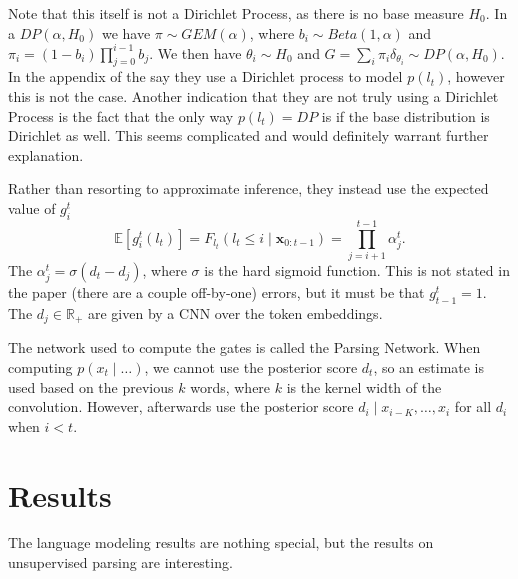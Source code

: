 \documentclass{article}
\newcommand\E[1]{\mathbb{E}\left[#1\right]}
\newcommand{\bx}{\mathbf{x}}
\newcommand{\R}{\mathbb{R}}
\begin{document}
Note that this itself is not a Dirichlet Process, as there is no base measure $H_0$.
In a $DP(\alpha, H_0)$ we have $\pi \sim GEM(\alpha)$,
where $b_i \sim Beta(1,\alpha)$ and $\pi_i = (1-b_i)\prod_{j=0}^{i-1}b_j$.
We then have $\theta_i\sim H_0$ and $G = \sum_i\pi_i\delta_{\theta_i}\sim DP(\alpha, H_0)$.
In the appendix of \citet{shen2018prpn} the say they use a Dirichlet process to model $p(l_t)$,
however this is not the case.
Another indication that they are not truly using a Dirichlet Process is the fact that
the only way $p(l_t) = DP$ is if the base distribution is Dirichlet as well.
This seems complicated and would definitely warrant further explanation.

Rather than resorting to approximate inference, they instead use the expected value of $g_i^t$
$$\E{g_i^t(l_t)} = F_{l_t}(l_t \le i\mid\bx_{0:t-1}) = \prod_{j=i+1}^{t-1}\alpha_j^t.$$
The $\alpha_j^t = \sigma(d_t - d_j)$, where $\sigma$ is the hard sigmoid function.
This is not stated in the paper (there are a couple off-by-one) errors,
but it must be that $g_{t-1}^t = 1$.
The $d_j\in\R_+$ are given by a CNN over the token embeddings.

The network used to compute the gates is called the Parsing Network.
When computing $p(x_t\mid\ldots)$, we cannot use the posterior score $d_t$,
so an estimate is used based on the previous $k$ words, where $k$ is the 
kernel width of the convolution.
However, afterwards \citet{shen2018prpn} use the posterior score $d_i \mid x_{i-K},\ldots, x_i$
for all $d_i$ when $i < t$.

\section{Results}
The language modeling results are nothing special,
but the results on unsupervised parsing are interesting.

\begin{comment}
\section{Comparison to CCM \citep{klein-2002-ccm}}
\citep{klein-2002-ccm2}
\citep{golland-2012-ccm,huang-2012-ccm}
\section{Comparison to StructVae \citep{yin18structvae}}
Hm, if we generated context given span, would that encourage non-constituents?
General question about segmental models.
\end{comment}
\end{document}
